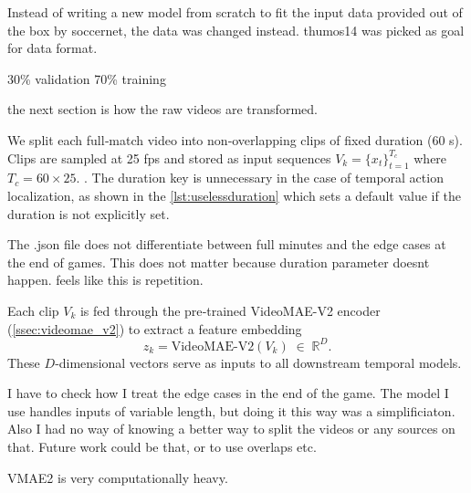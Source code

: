 Instead of writing a new model from scratch to fit the input data provided out of the box by soccernet, the data was changed instead. 
thumos14 was picked as goal for data format. 

30\% validation 70\% training


the next section is how the raw videos are transformed. 


We split each full‐match video into non‐overlapping clips of fixed duration (60 s). Clips are sampled at 25 fps and stored as input sequences $V_k=\{x_t\}_{t=1}^{T_c}$ where $T_c=60\times25$. . The duration key is unnecessary in the case of temporal action localization, as shown in the \autoref{lst:uselessduration} which sets a default value if the duration is not explicitly set. 



The .json file does not differentiate between full minutes and the edge cases at the end of games. This does not matter because duration parameter doesnt happen. feels like this is repetition. 

Each clip $V_k$ is fed through the pre‐trained VideoMAE-V2 encoder (\autoref{ssec:videomae_v2}) to extract a feature embedding
\[
z_k = \mathrm{VideoMAE\text{-}V2}(V_k)\;\in\;\mathbb{R}^D.
\]
These $D$‐dimensional vectors serve as inputs to all downstream temporal models.

I have to check how I treat the edge cases in the end of the game. The model I use handles inputs of variable length, but doing it this way was a simplificiaton. Also I had no way of knowing a better way to split the videos or any sources on that. 
Future work could be that, or to use overlaps etc. 

VMAE2 is very computationally heavy.

